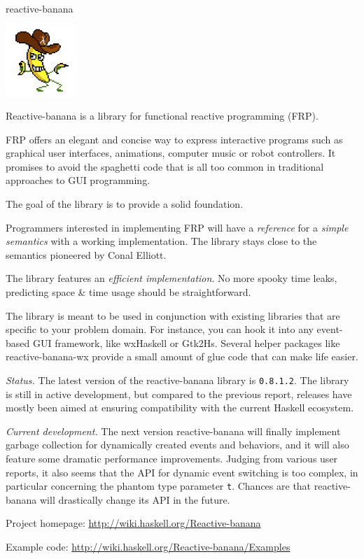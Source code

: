 \begin{hcarentry}[updated]{reactive-banana}
\makeheader

\begin{center}
\includegraphics[width=0.2\textwidth]{html/banana.jpg}
\end{center}

Reactive-banana is a library for functional reactive programming (FRP).

FRP offers an elegant and concise way to express interactive programs such as graphical user interfaces, animations, computer music or robot controllers. It promises to avoid the spaghetti code that is all too common in traditional approaches to GUI programming.

The goal of the library is to provide a solid foundation.
\begin{compactitem}
\item Programmers interested in implementing FRP will have a \emph{reference} for a \emph{simple semantics} with a working implementation. The library stays close to the semantics pioneered by Conal Elliott.
\item The library features an \emph{efficient implementation}. No more spooky time leaks, predicting space \& time usage should be straightforward.
\end{compactitem}

The library is meant to be used in conjunction with existing libraries that are specific to your problem domain. For instance, you can hook it into any event-based GUI framework, like wxHaskell or Gtk2Hs. Several helper packages like reactive-banana-wx provide a small amount of glue code that can make life easier.

\emph{Status.} The latest version of the reactive-banana library is \verb!0.8.1.2!. The library is still in active development, but compared to the previous report, releases have mostly been aimed at ensuring compatibility with the current Haskell ecosystem.

\emph{Current development.}
The next version reactive-banana will finally implement garbage collection for dynamically created events and behaviors, and it will also feature some dramatic performance improvements. Judging from various user reports, it also seems that the API for dynamic event switching is too complex, in particular concerning the phantom type parameter \verb`t`. Chances are that reactive-banana will drastically change its API in the future.

\FurtherReading
\begin{compactitem}
\item Project homepage: \url{http://wiki.haskell.org/Reactive-banana}
\item Example code: \url{http://wiki.haskell.org/Reactive-banana/Examples}
\end{compactitem}
\end{hcarentry}
